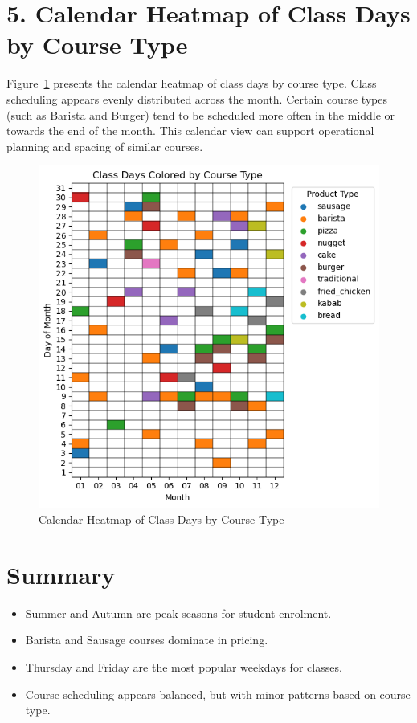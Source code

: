 \documentclass[12pt,a4paper]{article}
\begin{document}
\section*{5. Calendar Heatmap of Class Days by Course Type}

Figure~\ref{fig:calendar-heatmap} presents the calendar heatmap of class days by course type. Class scheduling appears evenly distributed across the month. Certain course types (such as Barista and Burger) tend to be scheduled more often in the middle or towards the end of the month. This calendar view can support operational planning and spacing of similar courses.

\begin{figure}[h!]
    \centering
    \includegraphics[width=1\textwidth]{Class Days Colored by Course Type.png}
    \caption{Calendar Heatmap of Class Days by Course Type}
    \label{fig:calendar-heatmap}
\end{figure}

\section*{Summary}

\begin{itemize}
    \item Summer and Autumn are peak seasons for student enrolment.
    \item Barista and Sausage courses dominate in pricing.
    \item Thursday and Friday are the most popular weekdays for classes.
    \item Course scheduling appears balanced, but with minor patterns based on course type.
\end{itemize}
\end{document}
